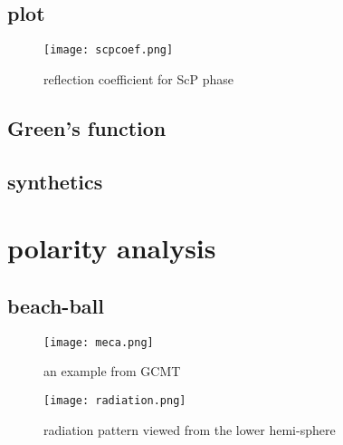 \documentclass{article}
\begin{document}
\subsection{plot}
\begin{figure}[H]
\centering
\texttt{[image: scpcoef.png]}
\caption{reflection coefficient for ScP phase}
\end{figure}
\subsection{Green's function}
\subsection{synthetics}

\section{polarity analysis}
\subsection{beach-ball}
\begin{figure}[H]
\centering
\texttt{[image: meca.png]}
\caption{an example from GCMT}
\end{figure}
\begin{figure}[H]
\centering
\texttt{[image: radiation.png]}
\caption{radiation pattern viewed from the lower hemi-sphere}
\end{figure}
\subsection{}
\end{document}
